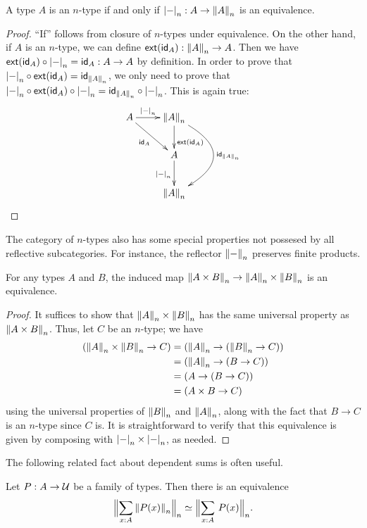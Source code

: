 \begin{cor}
  A type $A$ is an $n$-type if and only if $\tproj n- : A \to \trunc n A$ is an equivalence.
\end{cor}
\begin{proof}
  ``If'' follows from closure of $n$-types under equivalence.
  On the other hand, if $A$ is an $n$-type, we can define $\ext(\idfunc[A]):\trunc n A\to{}A$.
  Then we have $\ext(\idfunc[A])\circ\tproj n-=\idfunc[A]:A\to{}A$ by
  definition.  In order to prove that
  $\tproj n-\circ\ext(\idfunc[A])=\idfunc[\trunc nA]$, we only need to prove
  that $\tproj n-\circ\ext(\idfunc[A])\circ\tproj n-=
  \idfunc[\trunc nA]\circ\tproj n-$.
  This is again true:
  \[\xymatrix{
    A \ar^-{\tproj n-}[r] \ar_{\idfunc[A]}[rd] &
    \trunc nA \ar^>>>{\ext(\idfunc[A])}[d] \ar@/^40pt/^{\idfunc[\trunc nA]}[dd] \\
    & A \ar_{\tproj n-}[d] \\
    & \trunc nA}\]
\end{proof}

The category of $n$-types also has some special properties not possesed by all reflective subcategories.
For instance, the reflector $\trunc n-$ preserves finite products.

\begin{thm}\label{cor:trunc-prod}
  For any types $A$ and $B$, the induced map $\trunc n{A\times B} \to \trunc nA \times \trunc nB$ is an equivalence.
\end{thm}
\begin{proof}
  It suffices to show that $\trunc nA \times \trunc nB$ has the same universal property as $\trunc n{A\times B}$.
  Thus, let $C$ be an $n$-type; we have
  \begin{align*}
    (\trunc nA \times \trunc nB \to C)
    &= (\trunc nA \to (\trunc nB \to C))\\
    &= (\trunc nA \to (B \to C))\\
    &= (A \to (B \to C))\\
    &= (A \times B \to C)
  \end{align*}
  using the universal properties of $\trunc nB$ and $\trunc nA$, along with the fact that $B\to C$ is an $n$-type since $C$ is.
  It is straightforward to verify that this equivalence is given by composing with $\tproj n- \times \tproj n-$, as needed.
\end{proof}

The following related fact about dependent sums is often useful.

\begin{thm}\label{thm:trunc-in-truncated-sigma}
Let $P:A\to\type$ be a family of types. Then there is an equivalence
\begin{equation*}
\eqv{\Trunc n{\sm{x:A}\trunc n{P(x)}}}{\Trunc n{\sm{x:A}P(x)}}.
\end{equation*}
\end{thm}

